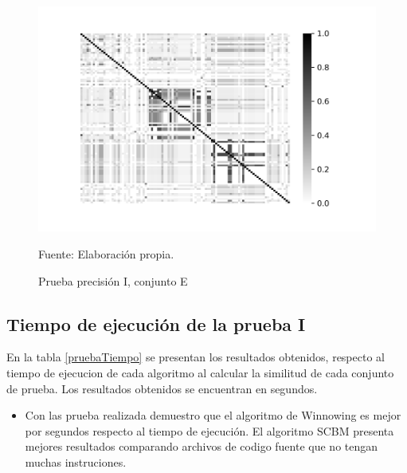 \begin{figure}[!h]
{\includegraphics[scale=0.41]{images/results/MAP_1089_WIN_W_15_K_5_PRECISION}}
\caption{Prueba precisión I, conjunto E}
Fuente: Elaboración propia.
\label{set_E_precision}
\end{figure}

\subsection{Tiempo de ejecución de la prueba I}
En la tabla \ref{pruebaTiempo} se presentan los resultados obtenidos, respecto al tiempo de ejecucion de cada algoritmo al calcular la similitud de cada conjunto de prueba. Los resultados obtenidos se encuentran en segundos.



\begin{itemize}
  \item Con las prueba realizada demuestro que el algoritmo de Winnowing es mejor por segundos respecto al tiempo de ejecución. El algoritmo SCBM presenta mejores resultados comparando archivos de codigo fuente que no tengan muchas instruciones.
\end{itemize}
